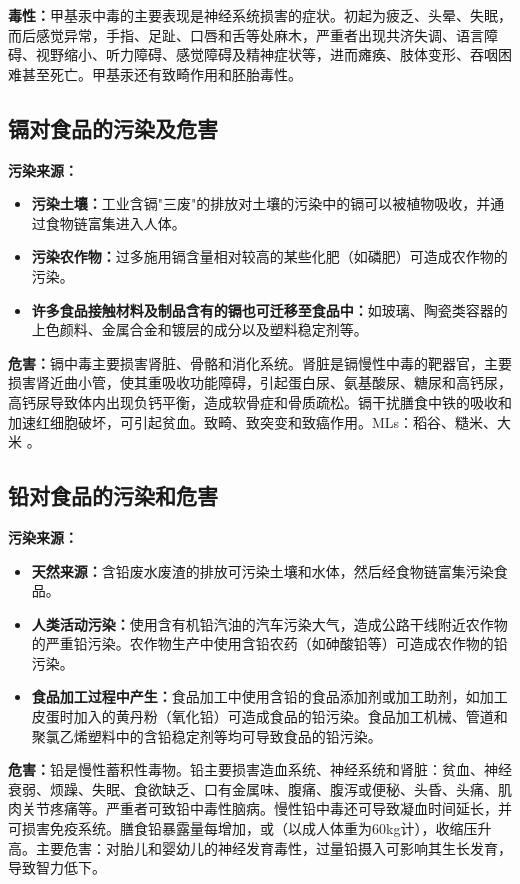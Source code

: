 \begin{keybox}
\textbf{毒性：}甲基汞中毒的主要表现是神经系统损害的症状。初起为疲乏、头晕、失眠，而后感觉异常，手指、足趾、口唇和舌等处麻木，严重者出现共济失调、语言障碍、视野缩小、听力障碍、感觉障碍及精神症状等，进而瘫痪、肢体变形、吞咽困难甚至死亡。甲基汞还有致畸作用和胚胎毒性。

\subsection{镉对食品的污染及危害}

\textbf{污染来源：}
\begin{itemize}[leftmargin=*]
    \item \textbf{污染土壤：}工业含镉"三废"的排放对土壤的污染中的镉可以被植物吸收，并通过食物链富集进入人体。
    \item \textbf{污染农作物：}过多施用镉含量相对较高的某些化肥（如磷肥）可造成农作物的污染。
    \item \textbf{许多食品接触材料及制品含有的镉也可迁移至食品中：}如玻璃、陶瓷类容器的上色颜料、金属合金和镀层的成分以及塑料稳定剂等。
\end{itemize}

\textbf{危害：}镉中毒主要损害肾脏、骨骼和消化系统。肾脏是镉慢性中毒的靶器官，主要损害肾近曲小管，使其重吸收功能障碍，引起蛋白尿、氨基酸尿、糖尿和高钙尿，高钙尿导致体内出现负钙平衡，造成软骨症和骨质疏松。镉干扰膳食中铁的吸收和加速红细胞破坏，可引起贫血。致畸、致突变和致癌作用。MLs：稻谷、糙米、大米 。

\subsection{铅对食品的污染和危害}

\textbf{污染来源：}
\begin{itemize}[leftmargin=*]
    \item \textbf{天然来源：}含铅废水废渣的排放可污染土壤和水体，然后经食物链富集污染食品。
    \item \textbf{人类活动污染：}使用含有机铅汽油的汽车污染大气，造成公路干线附近农作物的严重铅污染。农作物生产中使用含铅农药（如砷酸铅等）可造成农作物的铅污染。
    \item \textbf{食品加工过程中产生：}食品加工中使用含铅的食品添加剂或加工助剂，如加工皮蛋时加入的黄丹粉（氧化铅）可造成食品的铅污染。食品加工机械、管道和聚氯乙烯塑料中的含铅稳定剂等均可导致食品的铅污染。
\end{itemize}

\textbf{危害：}铅是慢性蓄积性毒物。铅主要损害造血系统、神经系统和肾脏：贫血、神经衰弱、烦躁、失眠、食欲缺乏、口有金属味、腹痛、腹泻或便秘、头昏、头痛、肌肉关节疼痛等。严重者可致铅中毒性脑病。慢性铅中毒还可导致凝血时间延长，并可损害免疫系统。膳食铅暴露量每增加，或（以成人体重为60kg计），收缩压升高。主要危害：对胎儿和婴幼儿的神经发育毒性，过量铅摄入可影响其生长发育，导致智力低下。
\end{keybox}

